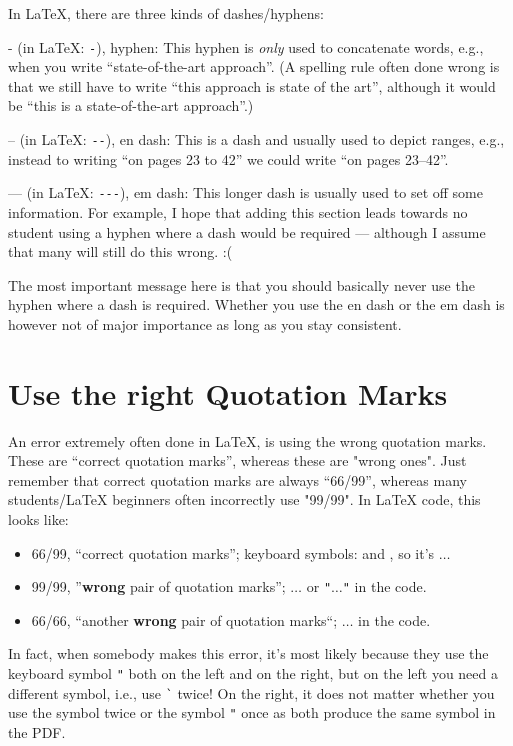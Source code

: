 In \LaTeX, there are three kinds of dashes/hyphens:
\begin{compactitem}
  \item - (in \LaTeX: \verb!-!), hyphen: This hyphen is \emph{only} used to concatenate words, e.g., when you write ``state-of-the-art approach''. (A spelling rule often done wrong is that we still have to write ``this approach is state of the art'', although it would be ``this is a state-of-the-art approach''.)
  \item -- (in \LaTeX: \verb!--!), en dash: This is a dash and usually used to depict ranges, e.g., instead to writing ``on pages 23 to 42'' we could write ``on pages 23--42''.
  \item --- (in \LaTeX: \verb!---!), em dash: This longer dash is usually used to set off some information. For example, I hope that adding this section leads towards no student using a hyphen where a dash would be required --- although I assume that many will still do this wrong. :(
\end{compactitem}

The most important message here is that you should basically never use the hyphen where a dash is required. Whether you use the en dash or the em dash is however not of major importance as long as you stay consistent.


\section{Use the right Quotation Marks}

An error extremely often done in \LaTeX{}, is using the wrong quotation marks. These are ``correct quotation marks'', whereas these are "wrong ones". Just remember that correct quotation marks are always ``66/99'', whereas many students/\LaTeX{} beginners often incorrectly use "99/99". In \LaTeX{} code, this looks like:
\begin{itemize}
  \item 66/99, ``correct quotation marks''; keyboard symbols: \textasciigrave and \textquotesingle, so it's \textasciigrave\textasciigrave$\dots$\textquotesingle\textquotesingle
  \item 99/99, ''\textbf{wrong} pair of quotation marks''; \textquotesingle\textquotesingle$\dots$\textquotesingle\textquotesingle{} or \verb!"!$\dots$\verb!"! in the code.
  \item 66/66, ``another \textbf{wrong} pair of quotation marks``; \textasciigrave\textasciigrave$\dots$\textasciigrave\textasciigrave{} in the code.
\end{itemize} 
In fact, when somebody makes this error, it's most likely because they use the keyboard symbol \verb!"! both on the left and on the right, but on the left you need a different symbol, i.e., use \verb!`! twice! On the right, it does not matter whether you use the symbol \textquotesingle{} twice or the symbol \verb!"! once as both produce the same symbol in the PDF.



